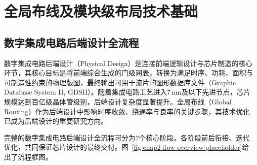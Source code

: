 \chapter{全局布线及模块级布局技术基础}
\label{cha:backend-flow-and-global-routing-fundamentals}

\section{数字集成电路后端设计全流程}

数字集成电路后端设计（Physical Design）是连接前端逻辑设计与芯片制造的核心环节，其核心目标是将前端综合生成的门级网表，转换为满足时序、功耗、面积与可制造性约束的物理版图，最终输出可用于流片的图形数据库文件（Graphic Database System II, GDSII）。随着集成电路工艺进入7\,nm及以下先进节点，芯片规模达到百亿级晶体管级别，后端设计复杂度显著提升。全局布线（Global Routing）作为后端设计中影响时序收敛、绕通率与良率的关键步骤，其技术优化已成为后端设计的重要研究方向。

完整的数字集成电路后端设计全流程可分为7个核心阶段。各阶段前后衔接、迭代优化，共同保证芯片设计的最终交付。图~\ref{fig:chap2-flow-overview-placeholder}给出了流程框图。

